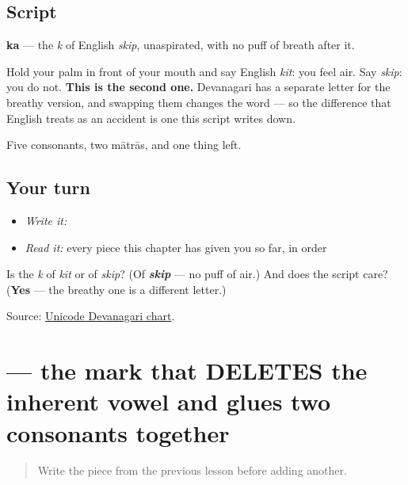 \subsection*{Script}
\begin{quote}
\end{quote}

\textbf{ka} — the \emph{k} of English \emph{skip}, unaspirated, with no puff of breath after it.

Hold your palm in front of your mouth and say English \emph{kit}: you feel air. Say \emph{skip}: you do not. \textbf{This is the second one.} Devanagari has a separate letter for the breathy version, and swapping them changes the word — so the difference that English treats as an accident is one this script writes down.

Five consonants, two mātrās, and one thing left.

\subsection*{Your turn}
\begin{itemize}
\raggedright
  \item \emph{Write it:} 
  \item \emph{Read it:} every piece this chapter has given you so far, in order
\end{itemize}

\begin{tcolorbox}[breakable,colback=teal!4,colframe=teal!35!black,title={Before you move on}]
Is \textbf{} the \emph{k} of \emph{kit} or of \emph{skip}? (Of \emph{\textbf{skip}} — no puff of air.) And does the script care? (\textbf{Yes} — the breathy one is a different letter.)

Source: \href{https://www.unicode.org/charts/PDF/U0900.pdf}{Unicode Devanagari chart}.
\end{tcolorbox}
\section[(virama)]{ — the mark that DELETES the inherent vowel and glues two consonants together}

\label{lesson:MR-W01-virama}



\begin{quote}
Write the piece from the previous lesson before adding another.
\end{quote}

